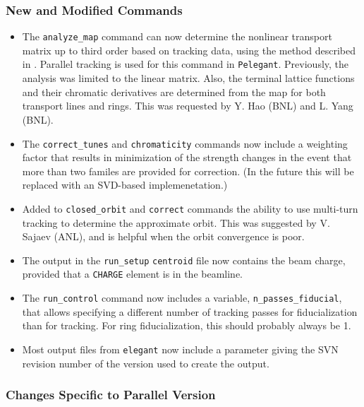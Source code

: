 \documentclass[11pt]{article}
\begin{document}
\subsubsection{New and Modified Commands}
\begin{itemize}
\item The \verb|analyze_map| command can now determine the nonlinear transport matrix up to third order based on tracking data,
  using the method described in \cite{Borland_thesis}. Parallel tracking is used for this command in {\tt Pelegant}.
  Previously, the analysis was limited to the linear matrix. Also, the terminal lattice functions and their chromatic derivatives
  are determined from the map for both transport lines and rings. This was requested by Y. Hao (BNL) and L. Yang (BNL).
\item The \verb|correct_tunes| and \verb|chromaticity| commands now include a weighting factor that results in minimization of
  the strength changes in the event that more than two familes are provided for correction. (In the future this will be replaced
  with an SVD-based implemenetation.)
\item Added to \verb|closed_orbit| and \verb|correct| commands the ability to use multi-turn tracking to determine the approximate orbit.
  This was suggested by V. Sajaev (ANL), and is helpful when the orbit convergence is poor.
\item The output in the \verb|run_setup| \verb|centroid| file now contains the beam charge, provided that
  a \verb|CHARGE| element is in the beamline.
\item The \verb|run_control| command now includes a variable, \verb|n_passes_fiducial|, that allows specifying a different number of
  tracking passes for fiducialization than for tracking. For ring fiducialization, this should probably always be 1.
\item Most output files from {\tt elegant} now include a parameter giving the SVN revision number of
  the version used to create the output.
\end{itemize}

\subsubsection{Changes Specific to Parallel Version}
\end{document}
